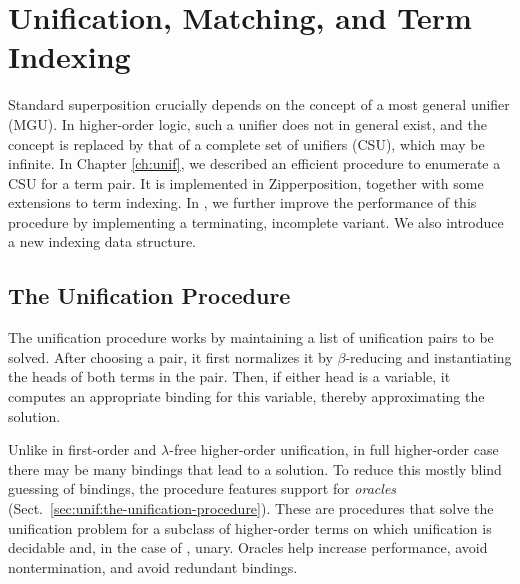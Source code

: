 \section{Unification, Matching, and Term Indexing}
\label{sec:ehoh2:unif-match-index}


Standard superposition crucially depends on the concept of a most general
unifier (MGU). In higher-order logic, such a unifier does not in general exist,
and the concept
is replaced by that of a complete set of unifiers (CSU), which may be infinite.
In Chapter \ref{ch:unif}, we described an efficient procedure to enumerate a CSU
for a term pair. It is implemented in Zipperposition, together with some
extensions to term indexing. In \ehohii{}, we further improve the performance of
this procedure by implementing a terminating, incomplete variant. We also
introduce a new indexing data structure.

\subsection{The Unification Procedure} 
The unification procedure works by maintaining a list of unification pairs to be solved.
After choosing a pair, it first normalizes it by $\beta$-reducing and
instantiating the heads of both terms in the pair. Then, if either head is a
variable, it computes an appropriate binding for this variable, thereby
approximating the solution.

Unlike in first-order and $\lambda$-free higher-order unification, in full
higher-order case there may be many bindings that lead to a solution. To reduce
this mostly blind guessing of bindings, the procedure features support for
\emph{oracles} (Sect.~\ref{sec:unif:the-unification-procedure}). These are
procedures that solve the unification problem for a subclass of higher-order
terms on which unification is decidable and, in the case of \ehohii{}, unary. Oracles help
increase performance, avoid nontermination, and avoid redundant bindings.

